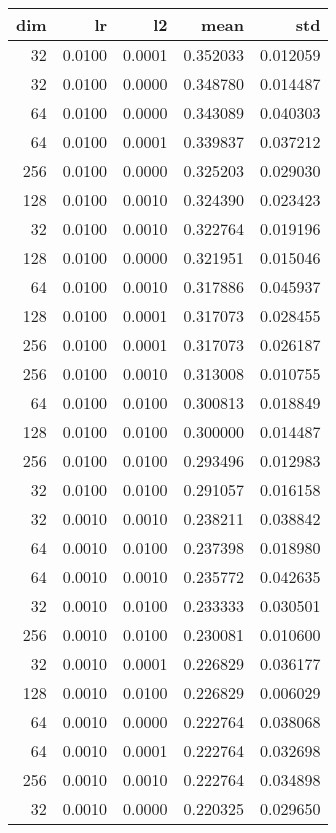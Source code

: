 \begin{tabular}{rrrrr}
\toprule
 dim &      lr &      l2 &      mean &       std \\
\midrule
  32 &  0.0100 &  0.0001 &  0.352033 &  0.012059 \\
  32 &  0.0100 &  0.0000 &  0.348780 &  0.014487 \\
  64 &  0.0100 &  0.0000 &  0.343089 &  0.040303 \\
  64 &  0.0100 &  0.0001 &  0.339837 &  0.037212 \\
 256 &  0.0100 &  0.0000 &  0.325203 &  0.029030 \\
 128 &  0.0100 &  0.0010 &  0.324390 &  0.023423 \\
  32 &  0.0100 &  0.0010 &  0.322764 &  0.019196 \\
 128 &  0.0100 &  0.0000 &  0.321951 &  0.015046 \\
  64 &  0.0100 &  0.0010 &  0.317886 &  0.045937 \\
 128 &  0.0100 &  0.0001 &  0.317073 &  0.028455 \\
 256 &  0.0100 &  0.0001 &  0.317073 &  0.026187 \\
 256 &  0.0100 &  0.0010 &  0.313008 &  0.010755 \\
  64 &  0.0100 &  0.0100 &  0.300813 &  0.018849 \\
 128 &  0.0100 &  0.0100 &  0.300000 &  0.014487 \\
 256 &  0.0100 &  0.0100 &  0.293496 &  0.012983 \\
  32 &  0.0100 &  0.0100 &  0.291057 &  0.016158 \\
  32 &  0.0010 &  0.0010 &  0.238211 &  0.038842 \\
  64 &  0.0010 &  0.0100 &  0.237398 &  0.018980 \\
  64 &  0.0010 &  0.0010 &  0.235772 &  0.042635 \\
  32 &  0.0010 &  0.0100 &  0.233333 &  0.030501 \\
 256 &  0.0010 &  0.0100 &  0.230081 &  0.010600 \\
  32 &  0.0010 &  0.0001 &  0.226829 &  0.036177 \\
 128 &  0.0010 &  0.0100 &  0.226829 &  0.006029 \\
  64 &  0.0010 &  0.0000 &  0.222764 &  0.038068 \\
  64 &  0.0010 &  0.0001 &  0.222764 &  0.032698 \\
 256 &  0.0010 &  0.0010 &  0.222764 &  0.034898 \\
  32 &  0.0010 &  0.0000 &  0.220325 &  0.029650 \\

\end{tabular}
